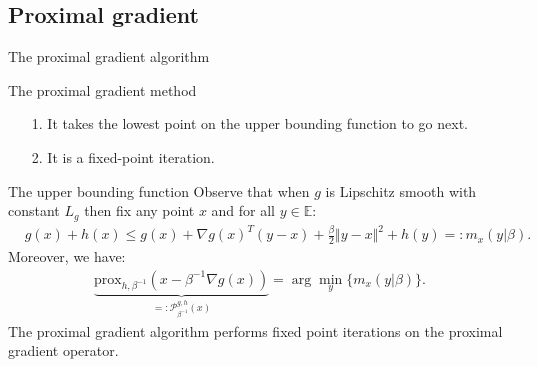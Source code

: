 \documentclass[11pt]{beamer}
\begin{document}
    \subsection{Proximal gradient}
        \begin{frame}{The proximal gradient algorithm}
            \begin{block}{The proximal gradient method}
                \begin{algorithm}[H]
                    \scriptsize
                    \begin{algorithmic}[1]
                        \ENDIF
                    \ENDFOR
                    \end{algorithmic}
                    \caption{Proximal gradient with fixed step-sizes}
                    \label{alg:1}
                \end{algorithm}
            \end{block}
            \begin{itemize}
                \item [1.] It takes the lowest point on the upper bounding function to go next. 
                \item [2.] It is a fixed-point iteration.
            \end{itemize}
        \end{frame}
        \begin{frame}{The upper bounding function}
            Observe that when $g$ is Lipschitz smooth with constant $L_g$ then fix any point $x$ and for all $y\in \mathbb E$:  
            \begin{align*}
                & g(x) + h(x) \le 
                g(x) + \nabla g(x)^T(y - x) + \frac{\beta}{2} \Vert y - x\Vert^2
                + h(y) =: m_x(y|\beta). 
            \end{align*}
            Moreover, we have: 
            \begin{align*}
                \underbrace{
                    \text{prox}_{h, \beta^{-1}}(x - \beta^{-1}\nabla g(x))
                    }_{
                        =:\mathcal P_{\beta^{-1}}^{g, h}(x)
                    } 
                = \arg\min_{y} \{m_x(y|\beta)\}.  
            \end{align*}
            The proximal gradient algorithm performs fixed point iterations on the proximal gradient operator. 
        \end{frame}
\end{document}
